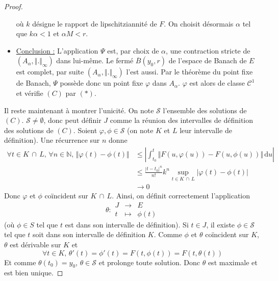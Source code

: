 \begin{proof}
\begin{itemize}
      où $k$ désigne le rapport de lipschitziannité de $F$. On choisit désormais $\alpha$ tel que $k \alpha < 1$ et $\alpha M < r$.
      \item \uline{Conclusion :} L'application $\Psi$ est, par choix de $\alpha$, une contraction stricte de $(A_\alpha, \Vert . \Vert_{\infty})$ dans lui-même. Le fermé $\overline{B}(y_0, r)$ de l'espace de Banach de $E$ est complet, par suite $(A_\alpha, \Vert . \Vert_{\infty})$ l'est aussi.
      \newpar
      Par le théorème du point fixe de Banach, $\Psi$ possède donc un point fixe $\varphi$ dans $A_\alpha$. $\varphi$ est alors de classe $\mathcal{C}^1$ et vérifie $(C)$ par $(*)$.
    \end{itemize}
    \medskip
    Il reste maintenant à montrer l'unicité. On note $\mathcal{S}$ l'ensemble des solutions de $(C)$. $\mathcal{S} \neq \emptyset$, donc peut définir $J$ comme la réunion des intervalles de définition des solutions de $(C)$.
    \newpar
    Soient $\varphi, \phi \in \mathcal{S}$ (on note $K$ et $L$ leur intervalle de définition). Une récurrence sur $n$ donne
    \begin{align*}
      \forall t \in K \, \cap \, L, \, \forall n \in \mathbb{N}, \, \Vert \varphi(t) - \phi(t) \Vert &\leq \left| \int_{t_0}^t \Vert F(u, \varphi(u)) - F(u, \phi(u)) \Vert \, \mathrm{d}u \right| \\
      &\leq \frac{|t-t_0|^n}{n!} k^n \sup_{t \in K \, \cap \, L} |\varphi(t) - \phi(t)| \\
      &\longrightarrow 0
    \end{align*}
    Donc $\varphi$ et $\phi$ coïncident sur $K \, \cap \, L$.
    \newpar
    Ainsi, on définit correctement l'application
    \[
    \theta :
    \begin{array}{ccc}
      J &\rightarrow& E \\
      t &\mapsto& \phi(t)
    \end{array}
    \]
    (où $\phi \in S$ tel que $t$ est dans son intervalle de définition). Si $t \in J$, il existe $\phi \in \mathcal{S}$ tel que $t$ soit dans son intervalle de définition $K$. Comme $\phi$ et $\theta$ coïncident sur $K$, $\theta$ est dérivable sur $K$ et
    \[ \forall t \in K, \, \theta'(t) = \phi'(t) = F(t, \phi(t)) = F(t, \theta(t)) \]
    Et comme $\theta(t_0) = y_0$, $\theta \in \mathcal{S}$ et prolonge toute solution. Donc $\theta$ est maximale et est bien unique.
  \end{proof}

